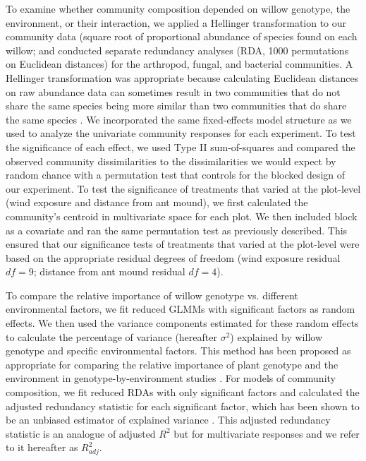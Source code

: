 \documentclass[11pt]{article}
\begin{document}
To examine whether community composition depended on willow genotype,
the environment, or their interaction, we applied a Hellinger
transformation to our community data (square root of proportional
abundance of species found on each willow; \cite{Legendre_2001} and
conducted separate redundancy analyses (RDA, 1000 permutations on
Euclidean distances) for the arthropod, fungal, and bacterial
communities. A Hellinger transformation was appropriate because
calculating Euclidean distances on raw abundance data can sometimes
result in two communities that do not share the same species being more
similar than two communities that do share the same species
\cite{Legendre_2001}. We incorporated the same fixed-effects model structure
as we used to analyze the univariate community responses for each
experiment. To test the significance of each effect, we used Type II
sum-of-squares and compared the observed community dissimilarities to
the dissimilarities we would expect by random chance with a permutation
test that controls for the blocked design of our experiment. To test the
significance of treatments that varied at the plot-level (wind exposure
and distance from ant mound), we first calculated the community's
centroid in multivariate space for each plot. We then included block as
a covariate and ran the same permutation test as previously described.
This ensured that our significance tests of treatments that varied at
the plot-level were based on the appropriate residual degrees of freedom
(wind exposure residual \(df=9\); distance from ant mound
residual \(df=4\)).

To compare the relative importance of willow genotype vs. different
environmental factors, we fit reduced GLMMs with significant factors as
random effects. We then used the variance components estimated for these
random effects to calculate the percentage of variance (hereafter
\(\sigma^2\)) explained by willow genotype and specific
environmental factors. This method has been proposed as appropriate for
comparing the relative importance of plant genotype and the environment
in genotype-by-environment studies \cite{Johnson_2005}\cite{Hersch_Green_2011}. For
models of community composition, we fit reduced RDAs with only
significant factors and calculated the adjusted redundancy statistic for
each significant factor, which has been shown to be an unbiased
estimator of explained variance \cite{Peres_Neto_2006}. This adjusted
redundancy statistic is an analogue of adjusted \(R^2\) but for
multivariate responses and we refer to it hereafter as \(R^2_{adj}\).
\end{document}
